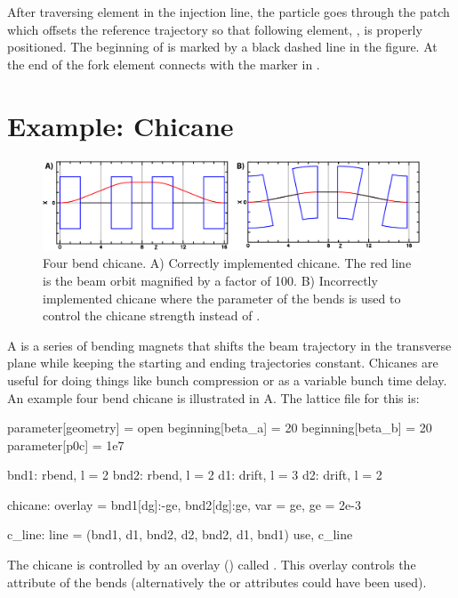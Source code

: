 After traversing element  in the injection line, the particle goes through the patch 
which offsets the reference trajectory so that following element, , is properly positioned.
The beginning of  is marked by a black dashed line in the figure.  At the end of 
the fork element  connects  with the marker  in .

\section{Example: Chicane}
\label{s:ex.chicane}

\begin{figure}[tb]
  \centering
  \includegraphics[width=5.5in]{chicane.pdf}
  \caption[Four bend chicane.]{Four bend chicane. A) Correctly implemented chicane. The red line is 
the beam orbit magnified by a factor of 100. B) Incorrectly implemented chicane where the 
parameter of the bends is used to control the chicane strength instead of .
  }
  \label{f:chicane}
\end{figure}

A  is a series of bending magnets that shifts the beam trajectory in the transverse
plane while keeping the starting and ending trajectories constant. Chicanes are useful for doing
things like bunch compression or as a variable bunch time delay. An example four bend chicane is
illustrated in A. The lattice file for this is:
\begin{example}
  parameter[geometry] = open
  beginning[beta_a] = 20
  beginning[beta_b] = 20
  parameter[p0c] = 1e7

  bnd1: rbend, l = 2
  bnd2: rbend, l = 2
  d1: drift, l = 3
  d2: drift, l = 2

  chicane: overlay = {bnd1[dg]:-ge, bnd2[dg]:ge}, var = {ge}, ge = 2e-3

  c_line: line = (bnd1, d1, bnd2, d2, bnd2, d1, bnd1)
  use, c_line
\end{example}
The chicane is controlled by an overlay () called . This overlay controls
the  attribute of the bends (alternatively the  or  attributes could have
been used).

